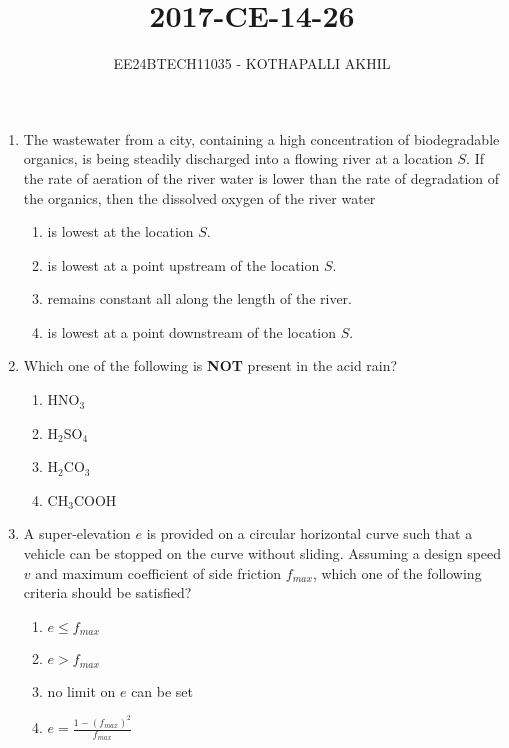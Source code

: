 \documentclass[article]{IEEEtran}
\numberwithin{figure}{enumi}
\begin{document}


\title{2017-CE-14-26}
\author{EE24BTECH11035 - KOTHAPALLI AKHIL}
{\let\newpage\relax\maketitle}
\begin{enumerate}


\item The wastewater from a city, containing a high concentration of biodegradable organics, is being steadily discharged into a flowing river at a location $S$. If the rate of aeration of the river water is lower than the rate of degradation of the organics, then the dissolved oxygen of the river water
    \begin{enumerate}
        \item is lowest at the location $S$.
        \item is lowest at a point upstream of the location $S$.
        \item remains constant all along the length of the river.
        \item is lowest at a point downstream of the location $S$.
    \end{enumerate}

\item Which one of the following is \textbf{NOT} present in the acid rain?
    \begin{enumerate}
        \item HNO$_3$
        \item H$_2$SO$_4$
        \item H$_2$CO$_3$
        \item CH$_3$COOH
    \end{enumerate}

\item A super-elevation $e$ is provided on a circular horizontal curve such that a vehicle can be stopped on the curve without sliding. Assuming a design speed $v$ and maximum coefficient of side friction $f_{max}$, which one of the following criteria should be satisfied?
    \begin{enumerate}
        \item $e \leq f_{max}$
        \item $e > f_{max}$
        \item no limit on $e$ can be set
        \item $e = \frac{1 - (f_{max})^2}{f_{max}}$
    \end{enumerate}


\end{enumerate}
\end{document}
